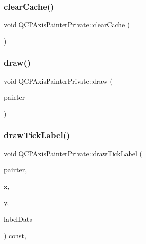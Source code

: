 \subsubsection{\texorpdfstring{clearCache()}{clearCache()}}
{\footnotesize\ttfamily void Q\+C\+P\+Axis\+Painter\+Private\+::clear\+Cache (\begin{DoxyParamCaption}{ }\end{DoxyParamCaption})}

\mbox{\label{class_q_c_p_axis_painter_private_a0207a99bdf9c4f70af20928898ddc2fc}} 
\subsubsection{\texorpdfstring{draw()}{draw()}}
{\footnotesize\ttfamily void Q\+C\+P\+Axis\+Painter\+Private\+::draw (\begin{DoxyParamCaption}\item[{\mbox{\hyperlink{class_q_c_p_painter}{Q\+C\+P\+Painter}} $\ast$}]{painter }\end{DoxyParamCaption})\hspace{0.3cm}{\ttfamily [virtual]}}

\mbox{\label{class_q_c_p_axis_painter_private_aab666e1d85b234afbc88076c7ba9424a}} 
\subsubsection{\texorpdfstring{drawTickLabel()}{drawTickLabel()}}
{\footnotesize\ttfamily void Q\+C\+P\+Axis\+Painter\+Private\+::draw\+Tick\+Label (\begin{DoxyParamCaption}\item[{\mbox{\hyperlink{class_q_c_p_painter}{Q\+C\+P\+Painter}} $\ast$}]{painter,  }\item[{double}]{x,  }\item[{double}]{y,  }\item[{const \mbox{\hyperlink{struct_q_c_p_axis_painter_private_1_1_tick_label_data}{Tick\+Label\+Data}} \&}]{label\+Data }\end{DoxyParamCaption}) const\hspace{0.3cm}{\ttfamily [protected]}, {\ttfamily [virtual]}}

